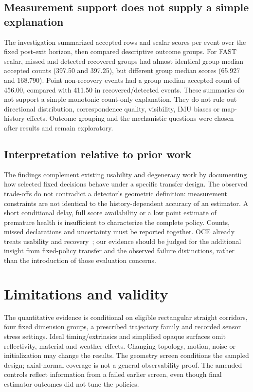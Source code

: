 \documentclass[conference]{IEEEtran}
\begin{document}
\subsection{Measurement support does not supply a simple explanation}
The investigation summarized accepted rows and scalar scores per event over
the fixed post-exit horizon, then compared descriptive outcome groups.
For FAST scalar, missed and detected recovered groups had almost identical
group median accepted counts (397.50 and 397.25), but different group median
scores (65.927 and 168.790). Point non-recovery events had a group median
accepted count of 456.00, compared with 411.50 in recovered/detected events.
These summaries do not support a simple monotonic count-only explanation.
They do not rule out directional distribution, correspondence quality,
visibility, IMU biases or map-history effects. Outcome grouping and the
mechanistic questions were chosen after results and remain exploratory.

\subsection{Interpretation relative to prior work}
The findings complement existing usability and degeneracy work by
documenting how selected fixed decisions behave under a specific transfer
design. The observed trade-offs do not contradict a detector's geometric
definition: measurement constraints are not identical to the history-dependent
accuracy of an estimator. A short conditional delay, full score availability
or a low point estimate of premature health is insufficient to characterize
the complete policy. Counts, missed declarations and uncertainty must be
reported together. OCE already treats usability and recovery~\cite{oce};
our evidence should be judged for the additional insight from fixed-policy
transfer and the observed failure distinctions, rather than the introduction
of those evaluation concerns.

\section{Limitations and validity}
The quantitative evidence is conditional on eligible rectangular straight
corridors, four fixed dimension groups, a prescribed trajectory family and
recorded sensor stress settings. Ideal timing/extrinsics and simplified
opaque surfaces omit reflectivity, material and weather effects. Changing
topology, motion, noise or initialization may change the results. The
geometry screen conditions the sampled design; axial-normal coverage is
not a general observability proof. The amended controls reflect information
from a failed earlier screen, even though final estimator outcomes did not
tune the policies.
\end{document}
